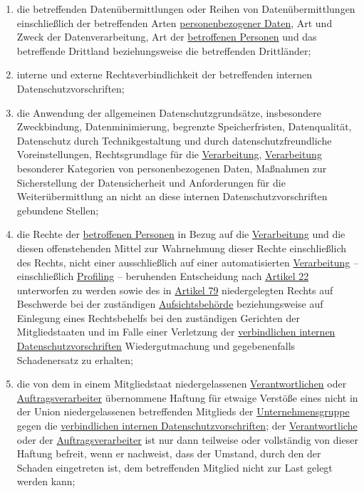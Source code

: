\begin{enumerate}
\begin{enumerate}
    \item die betreffenden Datenübermittlungen oder Reihen von Datenübermittlungen einschließlich der betreffenden Arten
     \hyperref[itm:04-1]{personenbezogener Daten}, Art und Zweck der Datenverarbeitung, Art der \hyperref[itm:04-1]{betroffenen Personen} und das betreffende
     Drittland beziehungsweise die betreffenden Drittländer;
    \label{itm:47-2b}

    \item interne und externe Rechtsverbindlichkeit der betreffenden internen Datenschutzvorschriften;
    \label{itm:47-2c}

    \item die Anwendung der allgemeinen Datenschutzgrundsätze, insbesondere Zweckbindung, Datenminimierung, begrenzte
     Speicherfristen, Datenqualität, Datenschutz durch Technikgestaltung und durch datenschutzfreundliche
     Voreinstellungen, Rechtsgrundlage für die \hyperref[itm:04-2]{Verarbeitung}, \hyperref[itm:04-2]{Verarbeitung} besonderer Kategorien von personenbezogenen
     Daten, Maßnahmen zur Sicherstellung der Datensicherheit und Anforderungen für die Weiterübermittlung an nicht an
     diese internen Datenschutzvorschriften gebundene Stellen;
    \label{itm:47-2d}

    \item die Rechte der \hyperref[itm:04-1]{betroffenen Personen} in Bezug auf die \hyperref[itm:04-2]{Verarbeitung} und die diesen offenstehenden Mittel zur
     Wahrnehmung dieser Rechte einschließlich des Rechts, nicht einer ausschließlich auf einer automatisierten
     \hyperref[itm:04-2]{Verarbeitung} -- einschließlich \hyperref[itm:04-4]{Profiling} -- beruhenden Entscheidung nach \hyperref[ch:22]{Artikel 22} unterworfen
     zu werden sowie des in \hyperref[ch:79]{Artikel 79} niedergelegten Rechts auf Beschwerde bei der zuständigen
     \hyperref[itm:04-21]{Aufsichtsbehörde} beziehungsweise auf Einlegung eines Rechtsbehelfs bei den zuständigen Gerichten der
     Mitgliedstaaten und im Falle einer Verletzung der \hyperref[itm:04-20]{verbindlichen internen Datenschutzvorschriften} Wiedergutmachung
     und gegebenenfalls Schadenersatz zu erhalten;
    \label{itm:47-2e}

    \item die von dem in einem Mitgliedstaat niedergelassenen \hyperref[itm:04-7]{Verantwortlichen} oder \hyperref[itm:04-8]{Auftragsverarbeiter} übernommene
     Haftung für etwaige Verstöße eines nicht in der Union niedergelassenen betreffenden Mitglieds der
     \hyperref[itm:04-19]{Unternehmensgruppe} gegen die \hyperref[itm:04-20]{verbindlichen internen Datenschutzvorschriften}; der \hyperref[itm:04-7]{Verantwortliche} oder der
     \hyperref[itm:04-8]{Auftragsverarbeiter} ist nur dann teilweise oder vollständig von dieser Haftung befreit, wenn er nachweist, dass
     der Umstand, durch den der Schaden eingetreten ist, dem betreffenden Mitglied nicht zur Last gelegt werden kann;
    \label{itm:47-2f}


\end{enumerate}
\end{enumerate}
